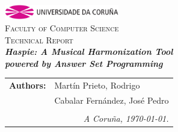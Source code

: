 \begin{titlepage}
\begin{center}
\includegraphics[width=5cm]{imagenes/anagramaUDC.png}\\
{\textsc{Faculty of Computer Science}} \\ [2.5cm]
{\Large \textsc{Technical Report}} \\[0.5cm]
{\Large \textsl{\textbf{Haspie: A Musical Harmonization Tool}}} \\[0.15cm]
{\Large \textsl{\textbf{powered by Answer Set Programming}}} \\
\vfill
\begin{flushright}
\begin{tabular}{ll}
\textbf{Authors:}    & Martín Prieto, Rodrigo \\
 & Cabalar Fernández, José Pedro \\
& \\
\multicolumn{2}{r}{\small \emph{A Coruña, \today{}.}} \\
\end{tabular}
\end{flushright}
\end{center}
\end{titlepage}
